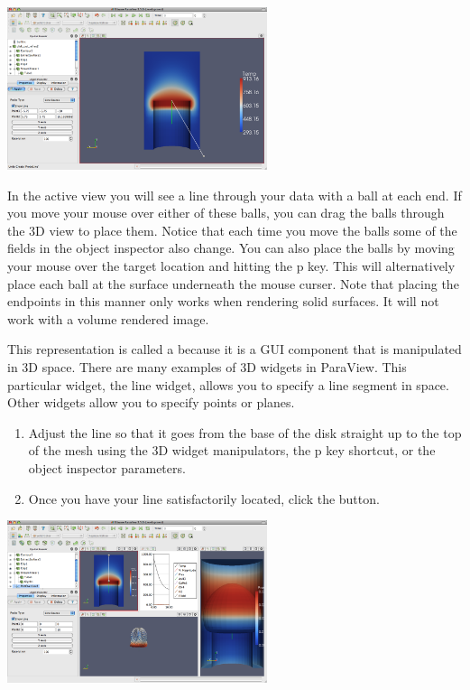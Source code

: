 \begin{inlinefig}
  \includegraphics[width=3in]{images/LinePlot1}
\end{inlinefig}

In the active view you will see a line through your data with a ball at
each end.  If you move your mouse over either of these balls, you can drag
the balls through the 3D view to place them.  Notice that each time you
move the balls some of the fields in the object inspector also change.  You
can also place the balls by moving your mouse over the target location and
hitting the p key.  This will alternatively place each ball at the surface
underneath the mouse curser.  Note that placing the endpoints in this
manner only works when rendering solid surfaces.  It will not work with a
volume rendered image.

This representation is called a  because it is a GUI
component that is manipulated in 3D space.  There are many examples of 3D
widgets in ParaView.  This particular widget, the line widget, allows you
to specify a line segment in space.  Other widgets allow you to specify
points or planes.

\begin{enumerate}
  \restorecounter
\item Adjust the line so that it goes from the base of the disk straight up
  to the top of the mesh using the 3D widget manipulators, the p key
  shortcut, or the object inspector parameters.
\item Once you have your line satisfactorily located, click the \apply
  button.
\end{enumerate}

\begin{inlinefig}
  \includegraphics[width=3in]{images/LinePlot2}
\end{inlinefig}

